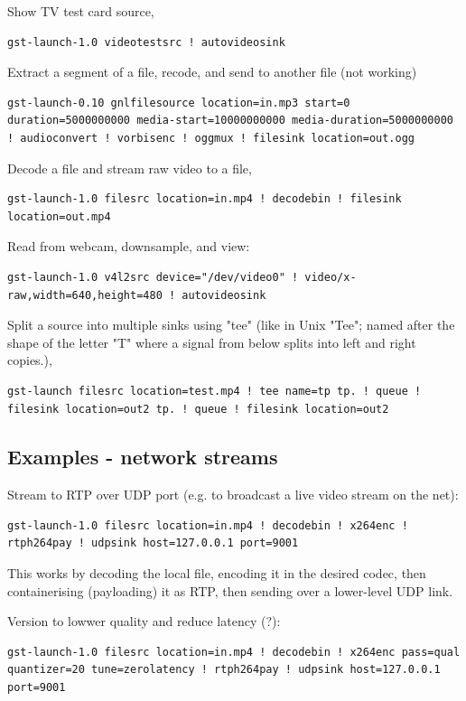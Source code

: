 \documentclass[oneside,english]{scrbook}
\begin{document}
Show TV test card source,
\begin{lstlisting}
gst-launch-1.0 videotestsrc ! autovideosink
\end{lstlisting}

Extract a segment of a file, recode, and send to another file (not
working) 

\begin{lstlisting}
gst-launch-0.10 gnlfilesource location=in.mp3 start=0
duration=5000000000 media-start=10000000000 media-duration=5000000000
! audioconvert ! vorbisenc ! oggmux ! filesink location=out.ogg
\end{lstlisting}

Decode a file and stream raw video to a file, 
\begin{lstlisting}
gst-launch-1.0 filesrc location=in.mp4 ! decodebin ! filesink location=out.mp4
\end{lstlisting}

Read from webcam, downsample, and view:
\begin{lstlisting}
gst-launch-1.0 v4l2src device="/dev/video0" ! video/x-raw,width=640,height=480 ! autovideosink
\end{lstlisting}

Split a source into multiple sinks using "tee" (like in Unix "Tee"; named after the shape of the letter "T" where a signal from below splits into left and right copies.),

\begin{lstlisting}
gst-launch filesrc location=test.mp4 ! tee name=tp tp. ! queue ! filesink location=out2 tp. ! queue ! filesink location=out2
\end{lstlisting}

\subsection{Examples - network streams}

Stream to RTP over UDP port (e.g. to broadcast a live video stream on the net):
\begin{lstlisting}
gst-launch-1.0 filesrc location=in.mp4 ! decodebin ! x264enc ! rtph264pay ! udpsink host=127.0.0.1 port=9001
\end{lstlisting}
This works by decoding the local file, encoding it in the desired codec, then containerising (payloading) it as RTP, then sending over a lower-level UDP link.

Version to lowwer quality and reduce latency (?):
\begin{lstlisting}
gst-launch-1.0 filesrc location=in.mp4 ! decodebin ! x264enc pass=qual quantizer=20 tune=zerolatency ! rtph264pay ! udpsink host=127.0.0.1 port=9001
\end{lstlisting}
\end{document}
